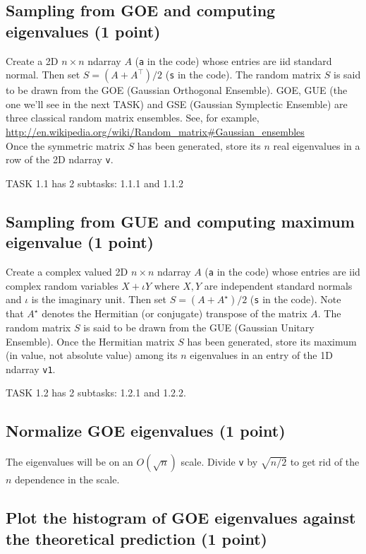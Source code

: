 \documentclass{article}
\begin{document}
\subsection{Sampling from GOE and computing eigenvalues (1 point)}

Create a 2D $n \times n$ ndarray $A$ (\verb#a# in the code) whose entries are iid standard normal. Then set $S = (A+A^\top)/2$ (\verb#s# in the code). The random matrix $S$ is said to be drawn from the GOE (Gaussian Orthogonal
Ensemble). GOE, GUE (the one we'll see in the next TASK) and GSE (Gaussian Symplectic Ensemble) are three classical random matrix ensembles. See, for example, \\
\url{http://en.wikipedia.org/wiki/Random_matrix#Gaussian_ensembles}\\
Once the symmetric matrix $S$ has been generated, store its $n$ real eigenvalues in a row of the 2D ndarray \verb#v#.

TASK 1.1 has 2 subtasks: 1.1.1 and 1.1.2

\subsection{Sampling from GUE and computing maximum eigenvalue (1 point)}

Create a complex valued 2D $n \times n$ ndarray $A$ (\verb#a# in the code) whose entries are iid complex random variables $X+ \iota Y$ where $X, Y$ are independent standard normals and $\iota$ is the imaginary unit. Then set $S = (A+A^\star)/2$ (\verb#s# in the code). Note that $A^\star$ denotes the Hermitian (or conjugate) transpose of the matrix $A$. The random matrix $S$ is said to be drawn from the GUE (Gaussian Unitary
Ensemble).
Once the Hermitian matrix $S$ has been generated, store its maximum (in value, not absolute value) among its $n$ eigenvalues in an entry of the 1D ndarray \verb#v1#.

TASK 1.2 has 2 subtasks: 1.2.1 and 1.2.2.

\subsection{Normalize GOE eigenvalues (1 point)}

The eigenvalues will be on an $O(\sqrt{n})$ scale. Divide \verb#v# by $\sqrt{n/2}$ to get rid of the $n$ dependence in the scale.

\subsection{Plot the histogram of GOE eigenvalues against the theoretical
prediction (1 point)}
\end{document}
